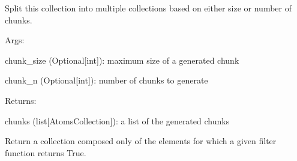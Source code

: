 \documentclass[letterpaper,10pt,english]{sphinxmanual}
\begin{document}
\begin{fulllineitems}
\begin{fulllineitems}
\label{doctree/soprano.collection.collection:soprano.collection.collection.AtomsCollection.all}
\end{fulllineitems}


\begin{fulllineitems}
\label{doctree/soprano.collection.collection:soprano.collection.collection.AtomsCollection.chunkify}
Split this collection into multiple collections based on either
size or number of chunks.

\begin{DUlineblock}{0em}
\item[] Args:
\item[]
\begin{DUlineblock}{\DUlineblockindent}
\item[] chunk\_size (Optional{[}int{]}): maximum size of a generated chunk
\item[] chunk\_n (Optional{[}int{]}): number of chunks to generate
\end{DUlineblock}
\end{DUlineblock}

\begin{DUlineblock}{0em}
\item[] Returns:
\item[]
\begin{DUlineblock}{\DUlineblockindent}
\item[] chunks (list{[}AtomsCollection{]}): a list of the generated chunks
\end{DUlineblock}
\end{DUlineblock}

\end{fulllineitems}


\begin{fulllineitems}
\label{doctree/soprano.collection.collection:soprano.collection.collection.AtomsCollection.filter}
Return a collection composed only of the elements for which a given
filter function returns True.


\end{fulllineitems}
\end{fulllineitems}
\end{document}
